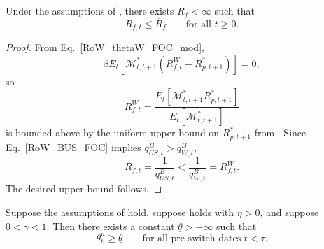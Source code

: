 \documentclass{article}
\begin{document}
\begin{lem}\label{lem_rf_upper_bound}
Under the assumptions of , there exists $\overline R_f<\infty$ such that
\[
R_{f,t}\le \overline R_f
\qquad\text{for all }t\ge 0.
\]
\end{lem}

\begin{proof}
From Eq.~\eqref{RoW_thetaW_FOC_mod},
\[
\beta E_t\!\left[\mathcal M_{t,t+1}^*(R_{f,t}^W-R_{p,t+1}^*)\right]=0,
\]
so
\[
R_{f,t}^W
=
\frac{E_t\!\left[\mathcal M_{t,t+1}^*R_{p,t+1}^*\right]}{E_t\!\left[\mathcal M_{t,t+1}^*\right]}
\]
is bounded above by the uniform upper bound on $R_{p,t+1}^*$ from . Since Eq.~\eqref{RoW_BUS_FOC} implies $q^B_{US,t}>q^B_{W,t}$,
\[
R_{f,t}=\frac{1}{q^B_{US,t}}<\frac{1}{q^B_{W,t}}=R_{f,t}^W.
\]
The desired upper bound follows.
\end{proof}

\begin{lem}\label{lem_US_bond_share_lower}
Suppose the assumptions of  hold, suppose  holds with $\eta>0$, and suppose $0<\gamma<1$. Then there exists a constant $\underline\theta>-\infty$ such that
\[
\theta_t^u\ge \underline\theta
\qquad\text{for all pre-switch dates }t<\tau.
\]
\end{lem}
\end{document}
